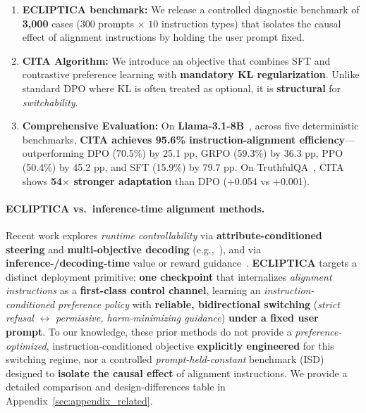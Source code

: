 \vspace{-0.35em}
\begin{enumerate}[leftmargin=*,itemsep=0em]

     \item \textbf{ECLIPTICA benchmark:} We release a controlled diagnostic benchmark of \textbf{3,000} cases ($300$ prompts $\times$ $10$ instruction types) that isolates the causal effect of alignment instructions by holding the user prompt fixed.

    \item \textbf{CITA Algorithm:} We introduce an objective that combines SFT and contrastive preference learning with \textbf{mandatory KL regularization}.
    Unlike standard DPO where KL is often treated as optional, it is \textbf{structural} for \emph{switchability}.

   

    \item \textbf{Comprehensive Evaluation:} On \textbf{Llama-3.1-8B}~\cite{dubey2024llama}, across five deterministic benchmarks, \textbf{CITA achieves \colorbox{bg-green}{95.6\%} instruction-alignment efficiency}---outperforming DPO (70.5\%) by 25.1 pp, GRPO (59.3\%) by 36.3 pp, PPO (50.4\%) by 45.2 pp, and SFT (15.9\%) by 79.7 pp. On TruthfulQA~\cite{lin2022truthfulqa}, CITA shows \textbf{54$\times$ stronger adaptation} than DPO (+0.054 vs +0.001).
\end{enumerate}


\paragraph{ECLIPTICA vs.\ inference-time alignment methods.}
Recent work explores \emph{runtime controllability} via \textbf{attribute-conditioned steering} and \textbf{multi-objective decoding}
(e.g.,~\cite{dong-etal-2023-steerlm,wang-etal-2024-arithmetic,shi2024decodingtime}),
and via \textbf{inference-/decoding-time} value or reward guidance~\cite{liu-etal-2024-inference,chen2025pad}.
\textbf{ECLIPTICA} targets a distinct deployment primitive: \textbf{one checkpoint} that internalizes \emph{alignment instructions} as a \textbf{first-class control channel},
learning an \emph{instruction-conditioned preference policy} with \textbf{reliable, bidirectional switching}
(\emph{strict refusal} $\leftrightarrow$ \emph{permissive, harm-minimizing guidance}) \textbf{under a fixed user prompt}.
To our knowledge, these prior methods do not provide a \emph{preference-optimized}, instruction-conditioned objective \textbf{explicitly engineered} for this switching regime,
nor a controlled \emph{prompt-held-constant} benchmark (ISD) designed to \textbf{isolate the causal effect} of alignment instructions.
We provide a detailed comparison and design-differences table in Appendix~\ref{sec:appendix_related}.

